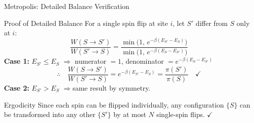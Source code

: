 \documentclass[10pt,aspectratio=169]{beamer}
\begin{document}
\begin{frame}{Metropolis: Detailed Balance Verification}
  \begin{block}{Proof of Detailed Balance}
    For a single spin flip at site $i$, let $S'$ differ from $S$ only at $i$:
    \[
      \frac{W(S \to S')}{W(S' \to S)}
      = \frac{\min\!\big(1,\, e^{-\beta(E_{S'} - E_S)}\big)}
             {\min\!\big(1,\, e^{-\beta(E_S - E_{S'})}\big)}
    \]
    \textbf{Case 1:} $E_{S'} \leq E_S$ \quad$\Rightarrow$\quad
    numerator $= 1$, denominator $= e^{-\beta(E_S - E_{S'})}$
    \[
      \therefore\quad \frac{W(S \to S')}{W(S' \to S)} = e^{-\beta(E_{S'} - E_S)}
      = \frac{\pi(S')}{\pi(S)} \quad\checkmark
    \]
    \textbf{Case 2:} $E_{S'} > E_S$ \quad$\Rightarrow$\quad same result by symmetry.
  \end{block}
  \vspace{0.3em}
  \begin{exampleblock}{Ergodicity}
    Since each spin can be flipped individually, any configuration $\{S\}$ can be transformed into any other $\{S'\}$ by at most $N$ single-spin flips. \quad$\checkmark$
  \end{exampleblock}
\end{frame}
\end{document}
